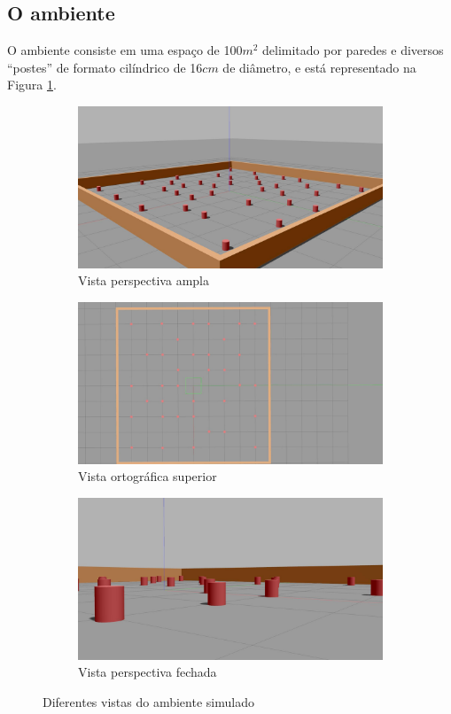 \subsection{O ambiente}
O ambiente consiste em uma espaço de 100$m^2$ delimitado por paredes e diversos ``postes'' de formato cilíndrico de 16$cm$ de diâmetro, e está representado na Figura \ref{fig:environment}.
\begin{figure}[h]
  \begin{subfigure}{.50\textwidth}
    \includegraphics[width=\textwidth]{figs/environment-perspective.jpg}
    \caption{Vista perspectiva ampla}
  \end{subfigure}
  \hfill
  \begin{subfigure}{.50\textwidth}
    \includegraphics[width=\textwidth]{figs/environment-birds-eye-of-view.jpg}
    \caption{Vista ortográfica superior}
  \end{subfigure}
  \hfill
  \begin{subfigure}{\textwidth}
    \centering
    \includegraphics[width=.5\textwidth]{figs/environment-closer-perspective.jpg}
    \caption{Vista perspectiva fechada}
  \end{subfigure}
  \caption{Diferentes vistas do ambiente simulado}
  \label{fig:environment}
\end{figure}

